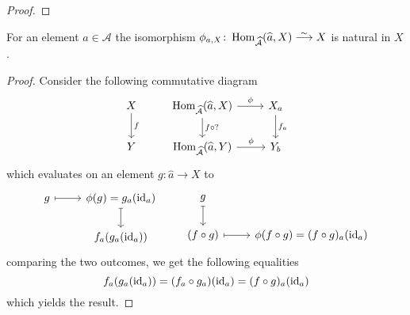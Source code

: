 \begin{proof}
\end{proof}

\begin{prop}
    For an element $a \in \mathcal{A}$ the isomorphism $\phi_{a,X} \colon \Hom_{\mathcal{\widehat{A}}}(\widehat{a},X) \isomorphism X$ is natural in $X$.
\end{prop}

\begin{proof}
    Consider the following commutative diagram 
    \[
    \begin{tikzcd}
        X
        \arrow[d,"f"]
        & 
        \Hom_{\widehat{\mathcal{A}}}(\widehat{a},X) 
        \arrow[r, "\phi"]
        \arrow[d, "f \circ ?"]
        &
        X_a
        \arrow[d,"f_a"]
        \\
        Y
        &
        \Hom_{\widehat{\mathcal{A}}}(\widehat{a}, Y) 
        \arrow[r, "\phi"]
        &
        Y_b
    \end{tikzcd}
    \]
    which evaluates on an element $g \colon \widehat{a} \to X$ to
    \[
    \begin{tikzcd}
        g
        \arrow[r,mapsto]
        &
        \phi(g) = g_a (\id_a)
        \arrow[d,mapsto]
        \\
        &
        f_a(g_a(\id_a))          
    \end{tikzcd}
    \qquad
    \begin{tikzcd}
        g
        \arrow[d,mapsto]
        &
        \\
        (f \circ g)
        \arrow[r, mapsto]
        & 
        \phi(f \circ g)=(f \circ g)_a(\id_a)
    \end{tikzcd}
    \]
    comparing the two outcomes, we get the following equalities
    \[
    f_a(g_a(\operatorname{id}_a))= (f_a \circ g_a)(\operatorname{id}_a) =(f \circ g)_a (\operatorname{id}_a)
    \]
    which yields the result.
\end{proof}

